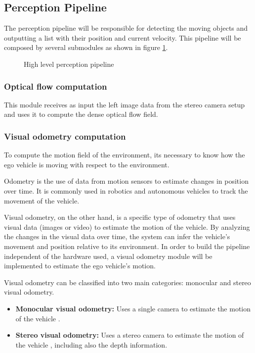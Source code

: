 \subsection{Perception Pipeline}%

The perception pipeline will be responsible for detecting the moving objects and outputting 
a list with their position and current velocity. This pipeline will be composed by several submodules as shown in figure \ref{fig:perception_pipeline_high_level}.

\begin{figure}[htb]
  \centering
  \resizebox{0.8\textwidth}{!}{}
  \caption{High level perception pipeline}
  \label{fig:perception_pipeline_high_level}
\end{figure}%

\subsubsection{Optical flow computation}

This module receives as input the left image data from the stereo camera setup and uses it to compute the dense optical flow field.

\subsubsection{Visual odometry computation}

To compute the motion field of the environment, its necessary to know how the ego vehicle is moving with respect 
to the environment.  

Odometry is the use of data from motion sensors to estimate changes in position over time. It is commonly used in 
robotics and autonomous vehicles to track the movement of the vehicle.

Visual odometry, on the other hand, is a specific type of odometry that uses visual data (images or video) to 
estimate the motion of the vehicle. By analyzing the changes in the visual data over time, the system can infer 
the vehicle's movement and position relative to its environment. 
In order to build the pipeline independent of the hardware used, a visual odometry module will 
be implemented to estimate the ego vehicle's motion. 

Visual odometry can be classified into two main categories: monocular and stereo visual odometry.

\begin{itemize}
  \item \textbf{Monocular visual odometry:} Uses a single camera to estimate the motion of the vehicle \cite{vo_mono}.
  \item \textbf{Stereo visual odometry:} Uses a stereo camera to estimate the motion of the vehicle \cite{vo_rev}, including also
  the depth information.
\end{itemize}

